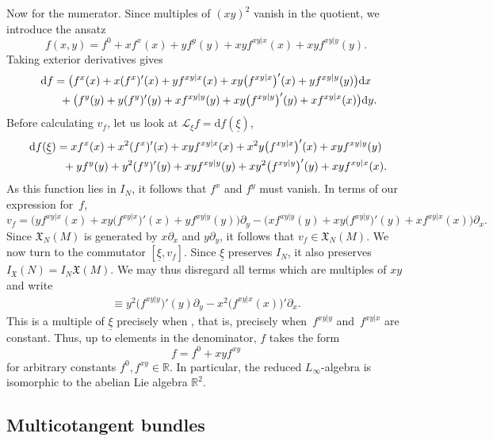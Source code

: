\documentclass[10pt,a4paper]{amsart}
\numberwithin{equation}{section}
\newcommand{\R}{\mathbb{R}}
\newcommand{\tgtvf}{\mathfrak X_N(M)}
\newcommand{\vanvf}{I_{\mathfrak{X}}(N)}%
\renewcommand{\L}{\mathscr{L}}
\renewcommand{\d}{\mathrm{d}}
\begin{document}
Now for the numerator. Since multiples of $(xy)^2$ vanish in the quotient, we introduce the ansatz
\[
	f(x,y)= f^0 + xf^x(x) +yf^y(y) + xyf^{xy|x}(x) + xyf^{xy|y}(y).
\]
Taking exterior derivatives gives
\begin{gather*}
	\d f= \bigl(f^x(x)+x(f^x)'(x)+ yf^{xy|x}(x) +xy\bigl(f^{xy|x}\bigr)'(x)   +yf^{xy|y}(y)\bigr)\d x		\\ \hphantom{\d f=}{}
		+ \bigl(f^y(y)+y(f^y)'(y)+ xf^{xy|y}(y) +xy\bigl(f^{xy|y}\bigr)'(y)   +xf^{xy|x}(x)\bigr)\d y.
\end{gather*}
Before calculating $v_f$, let us look at $\L_\xi f=\d f(\underline{\xi})$,
\begin{gather*}
	\d f(\underline{\xi})
        =	xf^x(x)+x^2(f^x)'(x)+ xyf^{xy|x}(x) +x^2y\bigl(f^{xy|x}\bigr)'(x)   +xyf^{xy|y}(y)	\\ \hphantom{\d f(\underline{\xi})=}{}
		+	yf^y(y)+y^2(f^y)'(y)+ xyf^{xy|y}(y) +xy^2\bigl(f^{xy|y}\bigr)'(y)   +xyf^{xy|x}(x).
\end{gather*}
As this function lies in $I_N$, it follows that $f^x$ and $f^y$ must vanish. In terms of our expression for~$f$,
\[
	v_f=    \bigl(yf^{xy|x}(x) +xy\bigl(f^{xy|x}\bigr)'(x)   +yf^{xy|y}(y)\bigr)\partial_y - \bigl(xf^{xy|y}(y) +xy\bigl(f^{xy|y}\bigr)'(y)   +xf^{xy|x}(x)\bigr)\partial_x.
\]
Since $\tgtvf$ is generated by $x\partial_x$ and $y\partial_y$, it follows that $v_f\in\tgtvf$. We now turn to the commutator $[\underline\xi,v_f]$. Since $\underline\xi$ preserves $I_N$, it also preserves $\vanvf=I_N\mathfrak X(M)$. We may thus disregard all terms which are multiples of $xy$ and write
\begin{align*}
	[\underline\xi,v_f]\equiv y^2\bigl(f^{xy|y}\bigr)'(y)\partial_y - x^2\bigl(f^{xy|x}(x)\bigr)'\partial_x.
\end{align*}
This is a multiple of $\underline\xi$ precisely when , that is, precisely when~$f^{xy|y}$ and~$f^{xy|x}$ are constant. Thus, up to elements in the denominator, $f$ takes the form
\[
f=f^0 + xyf^{xy}
\]
for arbitrary constants $f^0, f^{xy}\in\R$. In particular, the reduced $L_\infty$-algebra is isomorphic to the abelian Lie algebra $\mathbb R^2$.


\subsection{Multicotangent bundles}\label{Ssec:multicotangent}
\end{document}
